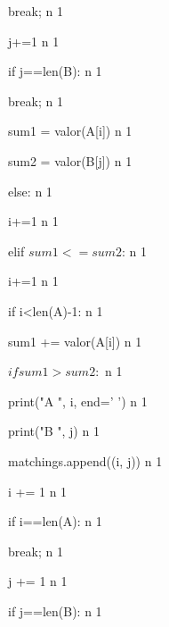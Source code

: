\documentclass{article}
\begin{document}
                        break;                                      n    1
                
                    j+=1                                            n    1
                
                    if j==len(B):                                   n    1
                
                        break;                                      n    1
                
                    sum1 = valor(A[i])                              n    1
                
                    sum2 = valor(B[j])                              n    1

            else:                                                   n    1
                
                i+=1                                                n    1
        
        elif $sum1 <= sum2$:                                        n    1
        
            i+=1                                                    n    1 
        
            if i<len(A)-1:                                          n    1
        
                sum1 += valor(A[i])                                 n    1
        
                $if sum1 > sum2:$                                   n    1
        
                    print("A ", i, end=' ')                         n    1
        
                    print("B ", j)                                  n    1
        
                    matchings.append((i, j))                        n    1
        
                    i += 1                                          n    1
        
                    if i==len(A):                                   n    1
        
                        break;                                      n    1
        
                    j += 1                                          n    1
        
                    if j==len(B):                                   n    1
            
\end{document}
